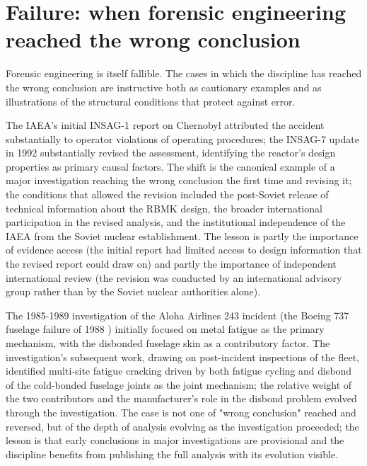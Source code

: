 \section{Failure: when forensic engineering reached the wrong conclusion}

Forensic engineering is itself fallible. The cases in which the discipline has reached the wrong conclusion are instructive both as cautionary examples and as illustrations of the structural conditions that protect against error.

The IAEA's initial INSAG-1 report on Chernobyl \cite{acc:iaea-insag1-1986} attributed the accident substantially to operator violations of operating procedures; the INSAG-7 update in 1992 \cite{acc:iaea-insag7-1992} substantially revised the assessment, identifying the reactor's design properties as primary causal factors. The shift is the canonical example of a major investigation reaching the wrong conclusion the first time and revising it; the conditions that allowed the revision included the post-Soviet release of technical information about the RBMK design, the broader international participation in the revised analysis, and the institutional independence of the IAEA from the Soviet nuclear establishment. The lesson is partly the importance of evidence access (the initial report had limited access to design information that the revised report could draw on) and partly the importance of independent international review (the revision was conducted by an international advisory group rather than by the Soviet nuclear authorities alone).

The 1985-1989 investigation of the Aloha Airlines 243 incident (the Boeing 737 fuselage failure of 1988 \cite{acc:ntsb-aar94-04}) initially focused on metal fatigue as the primary mechanism, with the disbonded fuselage skin as a contributory factor. The investigation's subsequent work, drawing on post-incident inspections of the fleet, identified multi-site fatigue cracking driven by both fatigue cycling and disbond of the cold-bonded fuselage joints as the joint mechanism; the relative weight of the two contributors and the manufacturer's role in the disbond problem evolved through the investigation. The case is not one of "wrong conclusion" reached and reversed, but of the depth of analysis evolving as the investigation proceeded; the lesson is that early conclusions in major investigations are provisional and the discipline benefits from publishing the full analysis with its evolution visible.

